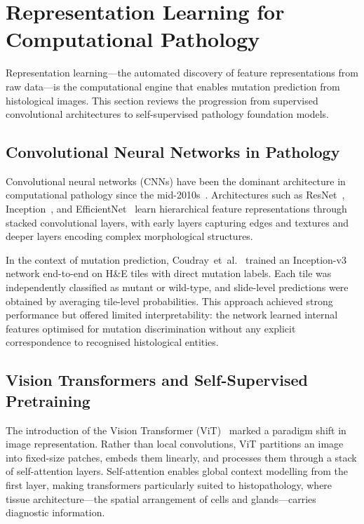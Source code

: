 \section{Representation Learning for Computational Pathology}
\label{sec:bg:representation}

Representation learning---the automated discovery of feature representations from raw data---is the computational engine that enables mutation prediction from histological images.
This section reviews the progression from supervised convolutional architectures to self-supervised pathology foundation models.

\subsection{Convolutional Neural Networks in Pathology}
\label{sec:bg:cnn}

Convolutional neural networks (CNNs) have been the dominant architecture in computational pathology since the mid-2010s~\cite{litjens2017survey}.
Architectures such as ResNet~\cite{he2016deep}, Inception~\cite{szegedy2016rethinking}, and EfficientNet~\cite{tan2019efficientnet} learn hierarchical feature representations through stacked convolutional layers, with early layers capturing edges and textures and deeper layers encoding complex morphological structures.

In the context of mutation prediction, Coudray~et~al.~\cite{coudray2018classification} trained an Inception-v3 network end-to-end on H\&E tiles with direct mutation labels.
Each tile was independently classified as mutant or wild-type, and slide-level predictions were obtained by averaging tile-level probabilities.
This approach achieved strong performance but offered limited interpretability: the network learned internal features optimised for mutation discrimination without any explicit correspondence to recognised histological entities.

\subsection{Vision Transformers and Self-Supervised Pretraining}
\label{sec:bg:vit}

The introduction of the Vision Transformer (ViT)~\cite{dosovitskiy2021image} marked a paradigm shift in image representation.
Rather than local convolutions, ViT partitions an image into fixed-size patches, embeds them linearly, and processes them through a stack of self-attention layers.
Self-attention enables global context modelling from the first layer, making transformers particularly suited to histopathology, where tissue architecture---the spatial arrangement of cells and glands---carries diagnostic information.

